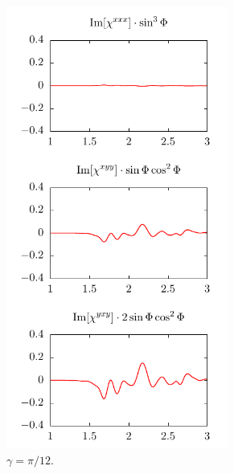 \documentclass[aps,prb,10pt,letterpaper,notitlepage]{revtex4-1}
\begin{document}
\begin{figure}[b]
    \centering
    \begin{subfigure}[b]{0.25\textwidth}
        \includegraphics[width=0.8\textwidth]{rot/comps15.pdf}
        \caption{$\gamma = \pi/12$.}
    \end{subfigure}
    ~ 
    \begin{subfigure}[b]{0.25\textwidth}

\end{subfigure}
\end{figure}
\end{document}

